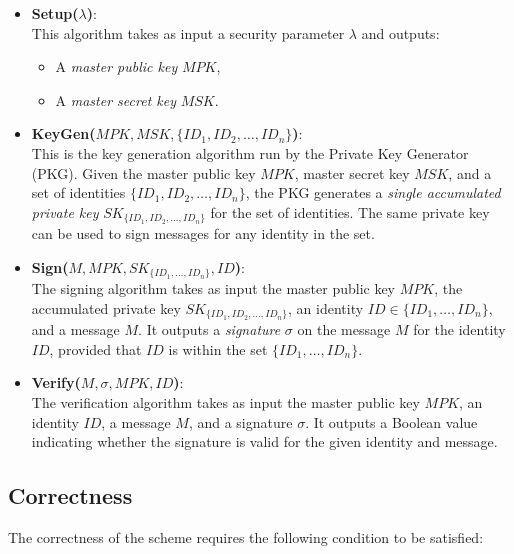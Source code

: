 \documentclass[12pt]{article}
\begin{document}
\begin{itemize}
    \item \textbf{Setup(\(\lambda\))}: \\
    This algorithm takes as input a security parameter \( \lambda \) and outputs:
    \begin{itemize}
        \item A \textit{master public key} \( MPK \),
        \item A \textit{master secret key} \( MSK \).
    \end{itemize}


    \item \textbf{KeyGen(\(MPK, MSK, \{ID_1, ID_2, \dots, ID_n\}\))}: \\
    This is the key generation algorithm run by the Private Key Generator (PKG). Given the master public key \( MPK \), master secret key \( MSK \), and a set of identities \( \{ID_1, ID_2, \dots, ID_n\} \), the PKG generates a \textit{single accumulated private key} \( SK_{\{ID_1, ID_2, \dots, ID_n\}} \) for the set of identities. The same private key can be used to sign messages for any identity in the set.

    \item \textbf{Sign(\(M, MPK, SK_{\{ID_1, \dots, ID_n\}}, ID\))}: \\
    The signing algorithm takes as input the master public key \( MPK \), the accumulated private key \( SK_{\{ID_1, ID_2, \dots, ID_n\}} \), an identity \( ID \in \{ID_1, \dots, ID_n\} \), and a message \( M \). It outputs a \textit{signature} \( \sigma \) on the message \( M \) for the identity \( ID \), provided that \( ID \) is within the set \( \{ID_1, \dots, ID_n\} \).

    \item \textbf{Verify(\(M,\sigma, MPK, ID\))}: \\
    The verification algorithm takes as input the master public key \( MPK \), an identity \( ID \), a message \( M \), and a signature \( \sigma \). It outputs a Boolean value indicating whether the signature is valid for the given identity and message. 
\end{itemize}

\subsection{Correctness}

The correctness of the scheme requires the following condition to be satisfied:
\end{document}
